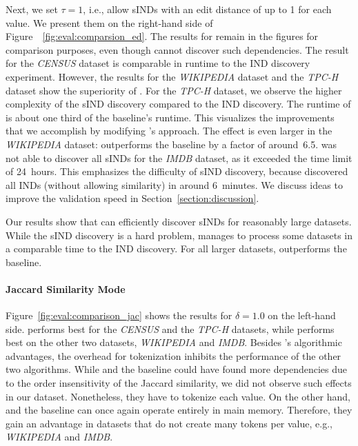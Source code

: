 Next, we set $\tau=1$, i.e., allow sINDs with an edit distance of up to 1 for each value.
We present them on the right-hand side of Figure~~\ref{fig:eval:comparsion_ed}.
The results for  remain in the figures for comparison purposes, even though  cannot discover such dependencies.
The result for the \emph{CENSUS} dataset is comparable in runtime to the IND discovery experiment.
However, the results for the \emph{WIKIPEDIA} dataset and the \emph{TPC-H} dataset show the superiority of \sawfish.
For the \emph{TPC-H} dataset, we observe the higher complexity of the sIND discovery compared to the IND discovery.
The runtime of \sawfish is about one third of the baseline's runtime.
This visualizes the improvements that we accomplish by modifying 's approach.
The effect is even larger in the \emph{WIKIPEDIA} dataset:
\sawfish outperforms the baseline by a factor of around~6.5. 
\sawfish was not able to discover all sINDs for the \emph{IMDB} dataset, as it exceeded the time limit of 24~hours.
This emphasizes the difficulty of sIND discovery, because \sawfish discovered all INDs (without allowing similarity) in around 6~minutes.
We discuss ideas to improve the validation speed in Section~\ref{section:discussion}.

Our results show that \sawfish can efficiently discover sINDs for reasonably large datasets.
While the sIND discovery is a hard problem, \sawfish manages to process some datasets in a comparable time to the IND discovery.
For all larger datasets, \sawfish outperforms the baseline.

\paragraph{Jaccard Similarity Mode}
Figure~\ref{fig:eval:comparison_jac} shows the results for $\delta = 1.0$ on the left-hand side.
 performs best for the \emph{CENSUS} and the \emph{TPC-H} datasets, while \sawfish performs best on the other two datasets, \emph{WIKIPEDIA} and \emph{IMDB}.
Besides 's algorithmic advantages, the overhead for tokenization inhibits the performance of the other two algorithms.
While \sawfish and the baseline could have found more dependencies due to the order insensitivity of the Jaccard similarity, we did not observe such effects in our dataset.
Nonetheless, they have to tokenize each value.
On the other hand, \sawfish and the baseline can once again operate entirely in main memory.
Therefore, they gain an advantage in datasets that do not create many tokens per value, e.g., \emph{WIKIPEDIA} and \emph{IMDB}.

